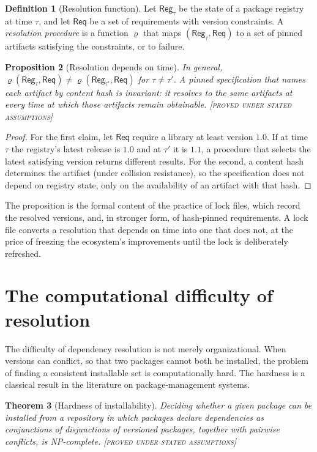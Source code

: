 \documentclass[11pt,twoside,openright]{book}
\theoremstyle{plain}
\newtheorem{theorem}{Theorem}[chapter]
\newtheorem{proposition}[theorem]{Proposition}
\theoremstyle{definition}
\newtheorem{definition}[theorem]{Definition}
\theoremstyle{remark}
\newcommand{\Proved}{\textup{\textsc{[proved under stated assumptions]}}}
\begin{document}
\begin{definition}[Resolution function]\label{def:resolution}
Let $\mathsf{Reg}_\tau$ be the state of a package registry at time $\tau$, and let $\mathsf{Req}$ be a set of requirements with version constraints. A \emph{resolution procedure} is a function $\varrho$ that maps $(\mathsf{Reg}_\tau,\mathsf{Req})$ to a set of pinned artifacts satisfying the constraints, or to failure.
\end{definition}

\begin{proposition}[Resolution depends on time]\label{prop:restime}
In general, $\varrho(\mathsf{Reg}_\tau,\mathsf{Req})\neq\varrho(\mathsf{Reg}_{\tau'},\mathsf{Req})$ for $\tau\neq\tau'$. A pinned specification that names each artifact by content hash is invariant: it resolves to the same artifacts at every time at which those artifacts remain obtainable.
\Proved{}
\end{proposition}

\begin{proof}
For the first claim, let $\mathsf{Req}$ require a library at least version $1.0$. If at time $\tau$ the registry's latest release is $1.0$ and at $\tau'$ it is $1.1$, a procedure that selects the latest satisfying version returns different results. For the second, a content hash determines the artifact (under collision resistance), so the specification does not depend on registry state, only on the availability of an artifact with that hash.
\end{proof}

The proposition is the formal content of the practice of lock files, which record the resolved versions, and, in stronger form, of hash-pinned requirements. A lock file converts a resolution that depends on time into one that does not, at the price of freezing the ecosystem's improvements until the lock is deliberately refreshed.

\section{The computational difficulty of resolution}

The difficulty of dependency resolution is not merely organizational. When versions can conflict, so that two packages cannot both be installed, the problem of finding a consistent installable set is computationally hard. The hardness is a classical result in the literature on package-management systems.

\begin{theorem}[Hardness of installability]\label{thm:installability}
Deciding whether a given package can be installed from a repository in which packages declare dependencies as conjunctions of disjunctions of versioned packages, together with pairwise conflicts, is NP-complete.
\Proved{}
\end{theorem}
\end{document}
